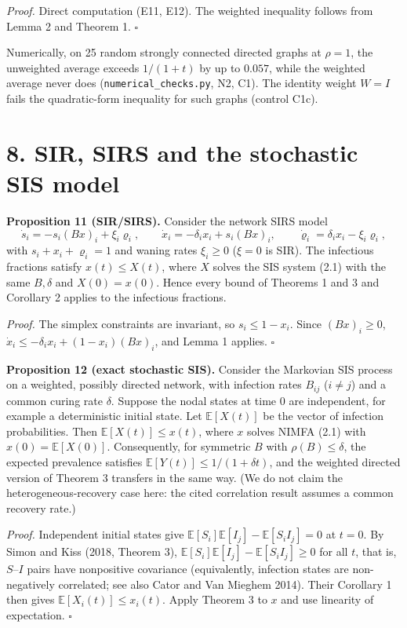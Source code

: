 \documentclass[
  11pt,
  a4paper,
]{article}
\begin{document}
\emph{Proof.} Direct computation (E11, E12). The weighted inequality
follows from Lemma 2 and Theorem 1. \(\square\)

Numerically, on 25 random strongly connected directed graphs at
\(\rho=1\), the unweighted average exceeds \(1/(1+t)\) by up to
\(0.057\), while the weighted average never does
(\texttt{numerical\_checks.py}, N2, C1). The identity weight \(W=I\)
fails the quadratic-form inequality for such graphs (control C1c).

\section{8. SIR, SIRS and the stochastic SIS
model}\label{sir-sirs-and-the-stochastic-sis-model}

\textbf{Proposition 11 (SIR/SIRS).} Consider the network SIRS model
\[\dot s_i=-s_i(Bx)_i+\xi_i\varrho_i,\qquad \dot x_i=-\delta_ix_i+s_i(Bx)_i,\qquad \dot\varrho_i=\delta_ix_i-\xi_i\varrho_i,\]
with \(s_i+x_i+\varrho_i=1\) and waning rates \(\xi_i\ge0\) (\(\xi=0\)
is SIR). The infectious fractions satisfy \(x(t)\le X(t)\), where \(X\)
solves the SIS system (2.1) with the same \(B,\delta\) and
\(X(0)=x(0)\). Hence every bound of Theorems 1 and 3 and Corollary 2
applies to the infectious fractions.

\emph{Proof.} The simplex constraints are invariant, so \(s_i\le1-x_i\).
Since \((Bx)_i\ge0\), \(\dot x_i\le-\delta_ix_i+(1-x_i)(Bx)_i\), and
Lemma 1 applies. \(\square\)

\textbf{Proposition 12 (exact stochastic SIS).} Consider the Markovian
SIS process on a weighted, possibly directed network, with infection
rates \(B_{ij}\) (\(i\neq j\)) and a common curing rate \(\delta\).
Suppose the nodal states at time 0 are independent, for example a
deterministic initial state. Let \(\mathbb E[X(t)]\) be the vector of
infection probabilities. Then \(\mathbb E[X(t)]\le x(t)\), where \(x\)
solves NIMFA (2.1) with \(x(0)=\mathbb E[X(0)]\). Consequently, for
symmetric \(B\) with \(\rho(B)\le\delta\), the expected prevalence
satisfies \(\mathbb E[Y(t)]\le1/(1+\delta t)\), and the weighted
directed version of Theorem 3 transfers in the same way. (We do not
claim the heterogeneous-recovery case here: the cited correlation result
assumes a common recovery rate.)

\emph{Proof.} Independent initial states give
\(\mathbb E[S_i]\mathbb E[I_j]-\mathbb E[S_iI_j]=0\) at \(t=0\). By
Simon and Kiss (2018, Theorem 3),
\(\mathbb E[S_i]\mathbb E[I_j]-\mathbb E[S_iI_j]\ge0\) for all \(t\),
that is, \(S\)--\(I\) pairs have nonpositive covariance (equivalently,
infection states are non-negatively correlated; see also Cator and Van
Mieghem 2014). Their Corollary 1 then gives
\(\mathbb E[X_i(t)]\le x_i(t)\). Apply Theorem 3 to \(x\) and use
linearity of expectation. \(\square\)
\end{document}
